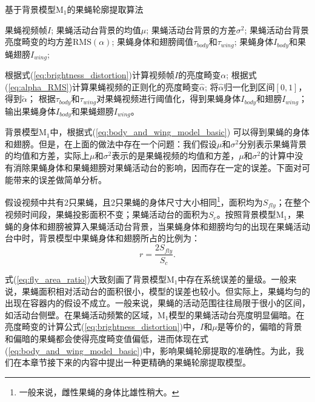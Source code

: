 \begin{algorithm}
\caption{基于背景模型$\textrm{M}_1$的果蝇轮廓提取算法}
\label{alg:fly_contour_model1_test}
\begin{algorithmic}[1]
\INPUT
    \Statex 果蝇视频帧$I$;
    \Statex 果蝇活动台背景的均值$\mu$;
    \Statex 果蝇活动台背景的方差$\sigma^{2}$;
    \Statex 果蝇活动台背景亮度畸变的均方差$\textrm{RMS}(\alpha)$;
    \Statex 果蝇身体和翅膀阈值$\tau_{body}$和$\tau_{wing}$;
\OUTPUT
    \Statex 果蝇身体$I_{body}$和果蝇翅膀$I_{wing}$;

\State 根据式(\ref{eq:brightness_distortion})计算视频帧$I$的亮度畸变$\alpha$;
\State 根据式(\ref{eq:alpha_RMS})计算果蝇视频的正则化的亮度畸变$\hat{\alpha}$;
\State 将$\hat{\alpha}$归一化到区间$[0, 1]$，得到$\tilde{\alpha}$；
\State 根据$\tau_{body}$和$\tau_{wing}$对果蝇视频进行阈值化，得到果蝇身体$I_{body}$和翅膀$I_{wing}$；
\State 输出果蝇身体$I_{body}$和果蝇翅膀$I_{wing}$。
\end{algorithmic}
\end{algorithm}

背景模型$\textrm{M}_1$中，根据式(\ref{eq:body_and_wing_model_basic}) 可以得到果蝇的身体和翅膀。但是，在上面的做法中存在一个问题：我们假设$\mu$和$\sigma^2$分别表示果蝇背景的均值和方差，实际上$\mu$和$\sigma^2$表示的是果蝇视频的均值和方差，$\mu$和$\sigma^2$的计算中没有消除果蝇身体和果蝇翅膀对果蝇活动台的影响，因而存在一定的误差。下面对可能带来的误差做简单分析。

假设视频中共有2只果蝇，且2只果蝇的身体尺寸大小相同\footnote{一般来说，雌性果蝇的身体比雄性稍大。}，面积均为$S_{fly}$；在整个视频时间段，果蝇投影面积不变；果蝇活动台的面积为$S_{c}$。按照背景模型$\textrm{M}_1$，果蝇的身体和翅膀被算入果蝇活动台背景，当果蝇身体和翅膀均匀的出现在果蝇活动台中时，背景模型中果蝇身体和翅膀所占的比例为：
\begin{equation}\label{eq:fly_area_ratio}
r = \frac{2S_{fly}}{S_{c}}.
\end{equation}

式(\ref{eq:fly_area_ratio})大致刻画了背景模型$\textrm{M}_1$中存在系统误差的量级。一般来说，果蝇面积相对活动台的面积很小，模型的误差也较小。但实际上，果蝇均匀的出现在容器内的假设不成立。一般来说，果蝇的活动范围往往局限于很小的区间，如活动台侧壁。在果蝇活动频繁的区域，$\textrm{M}_1$模型的果蝇活动台亮度明显偏暗。在亮度畸变的计算公式(\ref{eq:brightness_distortion})中，$I$和$\mu$是等价的，偏暗的背景和偏暗的果蝇都会使得亮度畸变值偏低，进而体现在式(\ref{eq:body_and_wing_model_basic})中，影响果蝇轮廓提取的准确性。为此，我们在本章节接下来的内容中提出一种更精确的果蝇轮廓提取模型。

